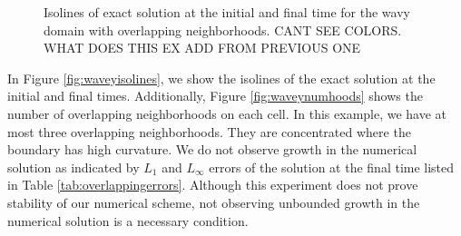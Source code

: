 \begin{figure}[h]
{}
\caption{Isolines of exact solution at the initial and final time for the
wavy domain with overlapping neighborhoods. CANT SEE COLORS. WHAT DOES
THIS EX ADD FROM PREVIOUS ONE} 
\end{figure}

In Figure \ref{fig:waveyisolines}, we show the isolines of the exact solution at the initial and final times.  Additionally, Figure \ref{fig:waveynumhoods} shows the number of overlapping neighborhoods on each cell.  In this example, we have at most three overlapping neighborhoods.  They are concentrated where the boundary has high curvature.   We do not observe growth in the numerical solution as indicated by $L_1$ and $L_\infty$ errors of the solution at the final time listed in Table \ref{tab:overlappingerrors}.  Although this experiment does not prove stability of our numerical scheme, not observing unbounded growth in the numerical solution is a necessary condition.


